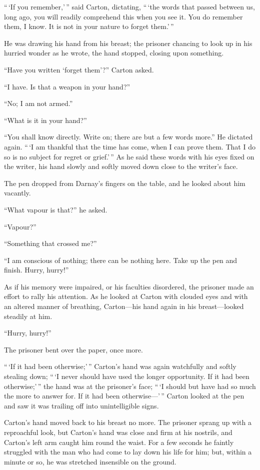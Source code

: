 ``\,`If you remember,'\,'' said Carton, dictating, ``\,`the words that passed
between us, long ago, you will readily comprehend this when you see it.
You do remember them, I know.  It is not in your nature to forget them.'\,''

He was drawing his hand from his breast; the prisoner chancing to
look up in his hurried wonder as he wrote, the hand stopped, closing
upon something.

``Have you written `forget them'?'' Carton asked.

``I have.  Is that a weapon in your hand?''

``No; I am not armed.''

``What is it in your hand?''

``You shall know directly.  Write on; there are but a few words more.''
He dictated again.  ``\,`I am thankful that the time has come, when I
can prove them.  That I do so is no subject for regret or grief.'\,''
As he said these words with his eyes fixed on the writer, his hand
slowly and softly moved down close to the writer's face.

The pen dropped from Darnay's fingers on the table, and he looked
about him vacantly.

``What vapour is that?'' he asked.

``Vapour?''

``Something that crossed me?''

``I am conscious of nothing; there can be nothing here.  Take up the
pen and finish.  Hurry, hurry!''

As if his memory were impaired, or his faculties disordered, the
prisoner made an effort to rally his attention.  As he looked at
Carton with clouded eyes and with an altered manner of breathing,
Carton---his hand again in his breast---looked steadily at him.

``Hurry, hurry!''

The prisoner bent over the paper, once more.

``\,`If it had been otherwise;'\,'' Carton's hand was again watchfully
and softly stealing down; ``\,`I never should have used the longer
opportunity. If it had been otherwise;'\,'' the hand was at the
prisoner's face; ``\,`I should but have had so much the more to answer
for.  If it had been otherwise---'\,'' Carton looked at the pen and saw
it was trailing off into unintelligible signs.

Carton's hand moved back to his breast no more.  The prisoner sprang
up with a reproachful look, but Carton's hand was close and firm at
his nostrils, and Carton's left arm caught him round the waist.
For a few seconds he faintly struggled with the man who had come
to lay down his life for him; but, within a minute or so, he was
stretched insensible on the ground.

